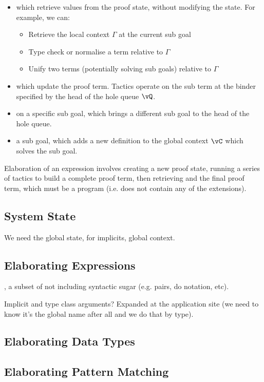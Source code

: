 \begin{itemize}
\item {} which retrieve values from the proof state, without modifying
the state. For example, we can:
\begin{itemize}
\item Retrieve the local context $\Gamma$ at the current sub goal
\item Type check or normalise a term relative to $\Gamma$
\item Unify two terms (potentially solving sub goals) relative to $\Gamma$ 
\end{itemize}
\item {} which update the proof term. Tactics operate on the sub term
at the binder specified by the head of the hole queue $\vQ$.
\item {} on a specific sub goal, which brings a different sub goal to the
head of the hole queue.
\item {} a sub goal, which adds a new definition to the global context
$\vC$ which solves the sub goal.
\end{itemize}

Elaboration of an \Idris{} expression involves creating a new proof state, running
a series of tactics to build a complete proof term, then retrieving and 
the final proof term, which must be a \TT{} program (i.e. does not contain any of the
\TTdev{} extensions).

\subsection{System State}

We need the global state, for implicits, global context.

\subsection{Elaborating Expressions}


\IdrisM{}, a subset of \Idris{} not including syntactic sugar (e.g. pairs, do notation, etc).

Implicit and type class arguments? Expanded at the application site (we need to know
it's the global name after all and we do that by type).

\subsection{Elaborating Data Types}

\subsection{Elaborating Pattern Matching}

